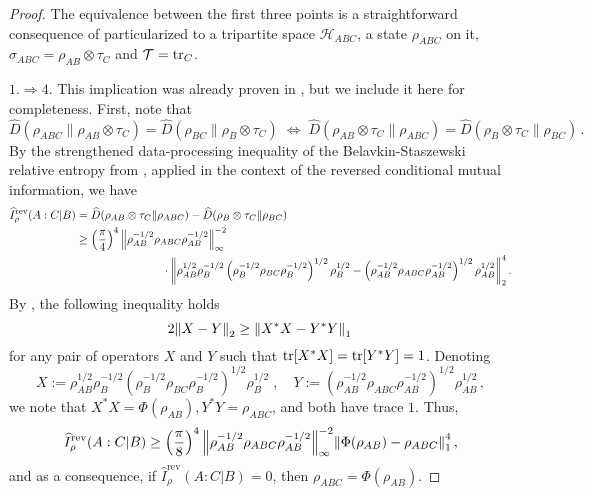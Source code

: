 \documentclass[11pt]{article}
\theoremstyle{newdefinition}
\theoremstyle{newplain}
\theoremstyle{myplain}
\DeclareMathOperator{\1}{\mathds{1}}
\begin{document}
{\begin{proof}
    The equivalence between the first three points is a straightforward consequence of  particularized to a tripartite space $\mathcal{H}_{ABC}$, a state $\rho_{ABC}$ on it, $\sigma_{ABC}=\rho_{AB} \otimes \tau_C$ and $\mathcal{T}=\tr_C$.

 \vspace{0.2cm}
     
\noindent  \underline{$1. \Rightarrow 4. $} This implication was already proven in \cite{gondolf2024conditional}, but we include it here for completeness. First, note that 
    \begin{equation}\label{eq:equivalent_equality_conditions_DPI}
        \widehat{D}(\rho_{ABC} \| \rho_{AB} \otimes \tau_C) =  \widehat{D}(\rho_{BC} \| \rho_{B} \otimes \tau_C) \; \Leftrightarrow \; \widehat{D}(\rho_{AB} \otimes \tau_C \| \rho_{ABC} ) =  \widehat{D}( \rho_{B} \otimes \tau_C \| \rho_{BC} ) \, .
    \end{equation}
     By the strengthened data-processing inequality of the Belavkin-Staszewski relative entropy from \cite{BluhmCapel-BSentropy-2019}, applied in the context of the reversed conditional mutual information, we have
     \begin{align}
         \widehat{I}^{\text{rev}}_\rho (A:C | B ) & = \widehat{D}(\rho_{AB} \otimes \tau_C \| \rho_{ABC} ) - \widehat{D}( \rho_{B} \otimes \tau_C \| \rho_{BC} ) \\
         & \geq \left( \frac{\pi}{4} \right)^4 \norm{ \rho_{AB}^{-1/2} \rho_{ABC} \rho_{AB}^{-1/2} }_\infty^{-2} \\
         & \hspace{2.7cm} \cdot \norm{ \rho^{1/2}_{AB} \rho^{-1/2}_{B} \left( \rho^{-1/2}_{B} \rho_{BC} \rho^{-1/2}_{B} \right)^{1/2}\rho^{1/2}_{B} - \left( \rho^{-1/2}_{AB} \rho_{ABC} \rho^{-1/2}_{AB} \right)^{1/2} \rho^{1/2}_{AB} }_2^4 \, .
     \end{align}
     By \cite[Lemma 2.2]{CarlenVershynina-Stability-DPI-RE-2017}, the following inequality holds
     \begin{equation}
         2 \norm{X-Y}_2 \geq \norm{X^* X - Y^* Y}_1 \, 
     \end{equation}
     for any pair of operators $X$ and $Y$ such that $\tr[X^* X] = \tr[Y^* Y]=1$. Denoting 
     \begin{equation}
         X:= \rho^{1/2}_{AB} \rho^{-1/2}_{B} \left( \rho^{-1/2}_{B} \rho_{BC} \rho^{-1/2}_{B} \right)^{1/2}\rho^{1/2}_{B} \; , \quad Y:= \left( \rho^{-1/2}_{AB} \rho_{ABC} \rho^{-1/2}_{AB} \right)^{1/2} \rho^{1/2}_{AB} \, ,
     \end{equation}
     we note that $X^*X = \Phi (\rho_{AB}), Y^* Y = \rho_{ABC}$, and both have trace $1$. Thus,  
     \begin{equation}
         \widehat{I}^{\text{rev}}_\rho (A:C | B )  \geq \left( \frac{\pi}{8} \right)^4 \norm{ \rho_{AB}^{-1/2} \rho_{ABC} \rho_{AB}^{-1/2} }_\infty^{-2}  \norm{ \Phi(\rho_{AB}) - \rho_{ABC}}^4_1 \, ,
     \end{equation}
     and as a consequence, if $\widehat{I}^{\text{rev}}_\rho (A:C | B ) = 0$, then  $ \rho_{ABC}= \Phi(\rho_{AB}) $. 


\end{proof}}
\end{document}
